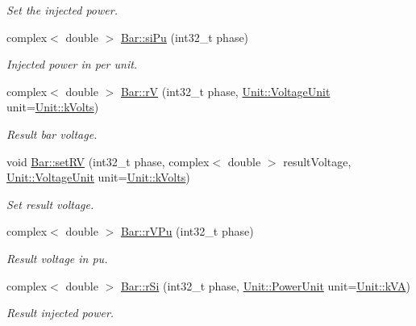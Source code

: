 \begin{DoxyCompactItemize}
\begin{DoxyCompactList}\small\item\em Set the injected power. \end{DoxyCompactList}\item 
complex$<$ double $>$ \hyperlink{group___models_ga8ac94a6b5f69417da962a7d87361b416}{Bar\+::si\+Pu} (int32\+\_\+t phase)
\begin{DoxyCompactList}\small\item\em Injected power in per unit. \end{DoxyCompactList}\item 
complex$<$ double $>$ \hyperlink{group___models_ga2d1f6bfbd8abaf168bb75bd8e5cd9b5e}{Bar\+::r\+V} (int32\+\_\+t phase, \hyperlink{class_unit_a55b07dfa9457e1eca2c7194fe0cfc3c1}{Unit\+::\+Voltage\+Unit} unit=\hyperlink{class_unit_a55b07dfa9457e1eca2c7194fe0cfc3c1aa54b2473993a702a3923525765bd6e4c}{Unit\+::k\+Volts})
\begin{DoxyCompactList}\small\item\em Result bar voltage. \end{DoxyCompactList}\item 
void \hyperlink{group___models_ga2b2c5a373d87025e79d26aa9c4cea75a}{Bar\+::set\+R\+V} (int32\+\_\+t phase, complex$<$ double $>$ result\+Voltage, \hyperlink{class_unit_a55b07dfa9457e1eca2c7194fe0cfc3c1}{Unit\+::\+Voltage\+Unit} unit=\hyperlink{class_unit_a55b07dfa9457e1eca2c7194fe0cfc3c1aa54b2473993a702a3923525765bd6e4c}{Unit\+::k\+Volts})
\begin{DoxyCompactList}\small\item\em Set result voltage. \end{DoxyCompactList}\item 
complex$<$ double $>$ \hyperlink{group___models_ga7deee8820e2ee3e0db993a1e76b68700}{Bar\+::r\+V\+Pu} (int32\+\_\+t phase)
\begin{DoxyCompactList}\small\item\em Result voltage in pu. \end{DoxyCompactList}\item 
complex$<$ double $>$ \hyperlink{group___models_gac8ddd4cb566d995b70b0f83146aa12b3}{Bar\+::r\+Si} (int32\+\_\+t phase, \hyperlink{class_unit_ace265ae255370ccacfd5370337572c3b}{Unit\+::\+Power\+Unit} unit=\hyperlink{class_unit_ace265ae255370ccacfd5370337572c3ba72b181a842ae2759488a2fa1410d3696}{Unit\+::k\+V\+A})
\begin{DoxyCompactList}\small\item\em Result injected power. \end{DoxyCompactList}\item 

\end{DoxyCompactItemize}
